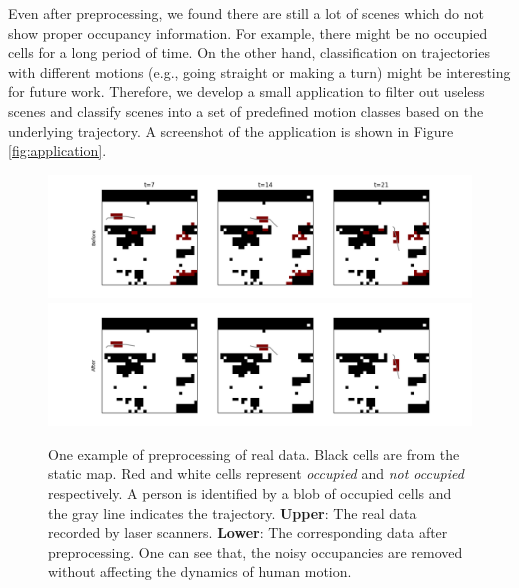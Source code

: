 Even after preprocessing, we found there are still a lot of scenes which do not show proper occupancy information. For example, there might be no occupied cells for a long period of time. On the other hand, classification on trajectories with different motions (e.g., going straight or making a turn) might be interesting for future work. Therefore, we develop a small application to filter out useless scenes and classify scenes into a set of predefined motion classes based on the underlying trajectory. A screenshot of the application is shown in Figure \ref{fig:application}.

\begin{figure}[ht]
\includegraphics[width=\textwidth]{figures/before.png} \\
\includegraphics[width=\textwidth]{figures/after.png}
\caption[One example of preprocessing of real data.]{One example of preprocessing of real data. Black cells are from the static map. Red and white cells represent \textit{occupied} and \textit{not occupied} respectively. A person is identified by a blob of occupied cells and the gray line indicates the trajectory. \textbf{Upper}: The real data recorded by laser scanners. \textbf{Lower}: The corresponding data after preprocessing. One can see that, the noisy occupancies are removed without affecting the dynamics of human motion.} 
\label{fig:preprocessing}
\end{figure}

